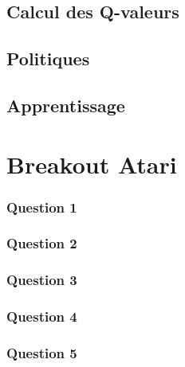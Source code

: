 \documentclass[10pt,a4paper]{article}
\begin{document}
\subsection{Calcul des Q-valeurs}

\subsection{Politiques}

\subsection{Apprentissage}

\section{Breakout Atari}

\subsubsection{Question 1}

\subsubsection{Question 2}

\subsubsection{Question 3}

\subsubsection{Question 4}

\subsubsection{Question 5}
\end{document}
